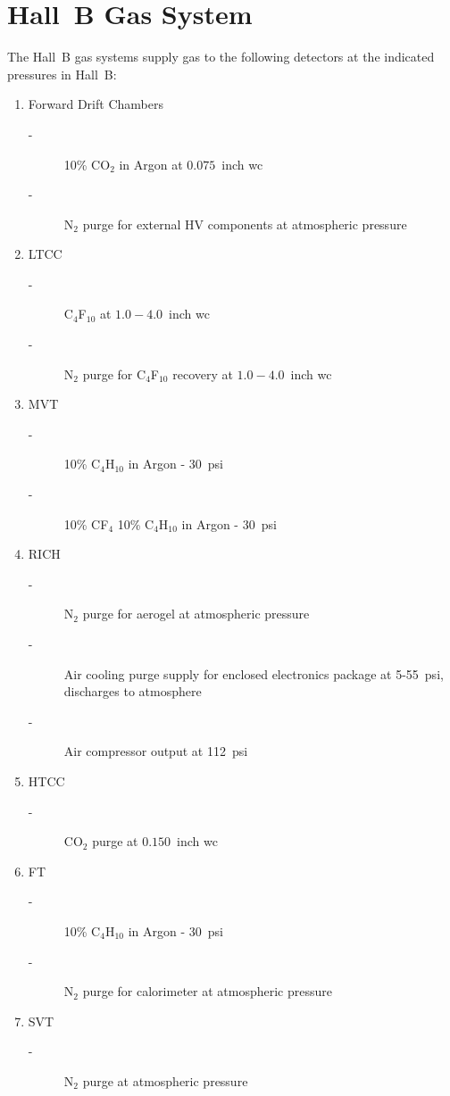 \section{Hall~B Gas System}

The Hall~B gas systems supply gas to the following detectors at the indicated pressures 
in Hall~B:
\begin{enumerate}
\item Forward Drift Chambers 
\begin{description}
\item[-] 10\% CO$_2$ in Argon at $0.075$~inch wc
\item[-] N$_2$ purge for external HV components at atmospheric pressure
\end{description}
\item LTCC 
\begin{description}
\item[-] C$_4$F$_{10}$ at $1.0 - 4.0$~inch wc
\item[-] N$_2$ purge for C$_4$F$_{10}$ recovery at $1.0-4.0$~inch wc
\end{description}
\item MVT 
\begin{description}
\item[-] 10\% C$_4$H$_{10}$ in Argon - 30~psi
\item[-] 10\% CF$_4$ 10\% C$_4$H$_{10}$ in Argon - 30~psi 
\end{description}
\item RICH 
\begin{description}
\item[-] N$_2$ purge for aerogel at atmospheric pressure
\item[-] Air cooling purge supply for enclosed electronics package at 5-55~psi, discharges to atmosphere
\item[-] Air compressor output at 112~psi 
\end{description}
\item HTCC 
\begin{description}
\item[-] CO$_2$ purge at $0.150$~inch wc 
\end{description}
\item FT 
\begin{description}
\item[-] 10\% C$_4$H$_{10}$ in Argon - 30~psi
\item[-] N$_2$ purge for calorimeter at atmospheric pressure 
\end{description}
\item SVT
\begin{description}
\item[-] N$_2$ purge at atmospheric pressure 
\end{description}
\end{enumerate}

